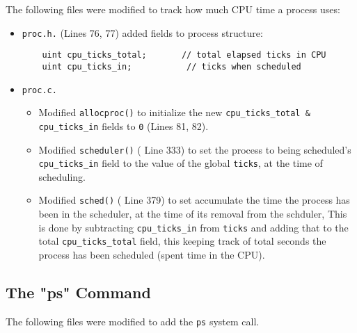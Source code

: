 \documentclass[11pt,letterpaper]{report}
\begin{document}
	The following files were modified to track how much CPU time a process uses:
	
	\begin{itemize}

	\item {\tt proc.h.} ({\color{red}Lines 76, 77}) added fields to process structure: 
	\begin{verbatim}
	uint cpu_ticks_total;		// total elapsed ticks in CPU
	uint cpu_ticks_in;			 // ticks when scheduled
	\end{verbatim}
	
	\item {\tt proc.c.}
		\begin{itemize}
			\item Modified {\tt allocproc()} to initialize the new {\tt cpu\_ticks\_total \& cpu\_ticks\_in} fields to {\tt 0} ({\color{red}Lines 81, 82}).
			
			\item Modified {\tt scheduler()} ({\color{red} Line 333}) to set the process to being scheduled's {\tt cpu\_ticks\_in} field to the value of the global {\tt ticks}, at the time of scheduling.
			
			\item Modified {\tt sched()} ({\color{red} Line 379}) to set accumulate the time the process has been in the scheduler, at the time of its removal from the schduler, This is done by subtracting {\tt cpu\_ticks\_in} from {\tt ticks} and adding that to the total {\tt cpu\_ticks\_total} field, this keeping track of total seconds the process has been scheduled (spent time in the CPU).
		\end{itemize}
	
	\end{itemize}	
\newpage
	\subsection*{The "ps" Command}
	The following files were modified to add the {\tt ps} system call.
	
\end{document}

